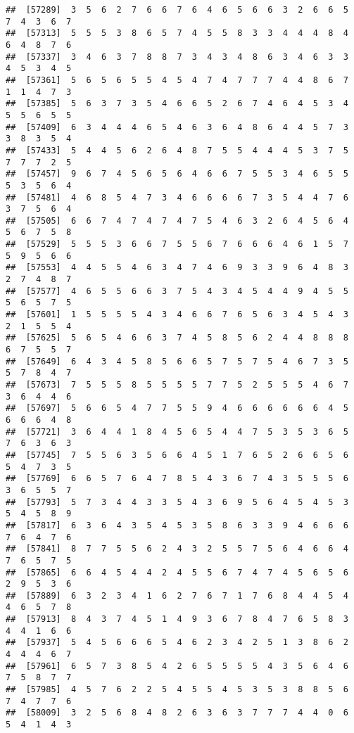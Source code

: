 \documentclass[
]{book}
\begin{document}
\begin{verbatim}
##  [57289]  3  5  6  2  7  6  6  7  6  4  6  5  6  6  3  2  6  6  5  7  4  3  6  7
##  [57313]  5  5  5  3  8  6  5  7  4  5  5  8  3  3  4  4  4  8  4  6  4  8  7  6
##  [57337]  3  4  6  3  7  8  8  7  3  4  3  4  8  6  3  4  6  3  3  4  5  3  4  5
##  [57361]  5  6  5  6  5  5  4  5  4  7  4  7  7  7  4  4  8  6  7  1  1  4  7  3
##  [57385]  5  6  3  7  3  5  4  6  6  5  2  6  7  4  6  4  5  3  4  5  5  6  5  5
##  [57409]  6  3  4  4  4  6  5  4  6  3  6  4  8  6  4  4  5  7  3  3  8  3  5  4
##  [57433]  5  4  4  5  6  2  6  4  8  7  5  5  4  4  4  5  3  7  5  7  7  7  2  5
##  [57457]  9  6  7  4  5  6  5  6  4  6  6  7  5  5  3  4  6  5  5  5  3  5  6  4
##  [57481]  4  6  8  5  4  7  3  4  6  6  6  6  7  3  5  4  4  7  6  3  7  5  6  4
##  [57505]  6  6  7  4  7  4  7  4  7  5  4  6  3  2  6  4  5  6  4  5  6  7  5  8
##  [57529]  5  5  5  3  6  6  7  5  5  6  7  6  6  6  4  6  1  5  7  5  9  5  6  6
##  [57553]  4  4  5  5  4  6  3  4  7  4  6  9  3  3  9  6  4  8  3  2  7  4  8  7
##  [57577]  4  6  5  5  6  6  3  7  5  4  3  4  5  4  4  9  4  5  5  5  6  5  7  5
##  [57601]  1  5  5  5  5  4  3  4  6  6  7  6  5  6  3  4  5  4  3  2  1  5  5  4
##  [57625]  5  6  5  4  6  6  3  7  4  5  8  5  6  2  4  4  8  8  8  6  7  5  5  7
##  [57649]  6  4  3  4  5  8  5  6  6  5  7  5  7  5  4  6  7  3  5  5  7  8  4  7
##  [57673]  7  5  5  5  8  5  5  5  5  7  7  5  2  5  5  5  4  6  7  3  6  4  4  6
##  [57697]  5  6  6  5  4  7  7  5  5  9  4  6  6  6  6  6  6  4  5  6  6  6  4  8
##  [57721]  3  6  4  4  1  8  4  5  6  5  4  4  7  5  3  5  3  6  5  7  6  3  6  3
##  [57745]  7  5  5  6  3  5  6  6  4  5  1  7  6  5  2  6  6  5  6  5  4  7  3  5
##  [57769]  6  6  5  7  6  4  7  8  5  4  3  6  7  4  3  5  5  5  6  3  6  5  5  7
##  [57793]  5  7  3  4  4  3  3  5  4  3  6  9  5  6  4  5  4  5  3  5  4  5  8  9
##  [57817]  6  3  6  4  3  5  4  5  3  5  8  6  3  3  9  4  6  6  6  7  6  4  7  6
##  [57841]  8  7  7  5  5  6  2  4  3  2  5  5  7  5  6  4  6  6  4  7  6  5  7  5
##  [57865]  6  6  4  5  4  4  2  4  5  5  6  7  4  7  4  5  6  5  6  2  9  5  3  6
##  [57889]  6  3  2  3  4  1  6  2  7  6  7  1  7  6  8  4  4  5  4  4  6  5  7  8
##  [57913]  8  4  3  7  4  5  1  4  9  3  6  7  8  4  7  6  5  8  3  4  4  1  6  6
##  [57937]  5  4  5  6  6  6  5  4  6  2  3  4  2  5  1  3  8  6  2  4  4  4  6  7
##  [57961]  6  5  7  3  8  5  4  2  6  5  5  5  5  4  3  5  6  4  6  7  5  8  7  7
##  [57985]  4  5  7  6  2  2  5  4  5  5  4  5  3  5  3  8  8  5  6  7  4  7  7  6
##  [58009]  3  2  5  6  8  4  8  2  6  3  6  3  7  7  7  4  4  0  6  5  4  1  4  3

\end{verbatim}
\end{document}
